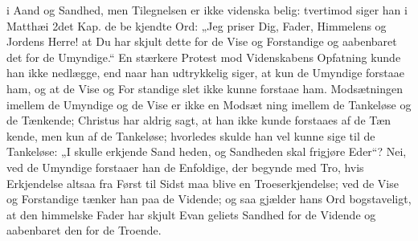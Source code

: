 \documentclass[12pt]{book}
\begin{document}
i Aand og Sandhed, men Tilegnelsen er ikke videnska\-%
belig: tvertimod siger han i Matthæi 2det Kap. de be\-%
kjendte Ord: „Jeg priser Dig, Fader, Himmelens og
Jordens Herre! at Du har skjult dette for de Vise og
Forstandige og aabenbaret det for de Umyndige.“ En
stærkere Protest mod Videnskabens Opfatning kunde
han ikke nedlægge, end naar han udtrykkelig siger, at
kun de Umyndige forstaae ham, og at de Vise og For\-%
standige slet ikke kunne forstaae ham. Modsætningen
imellem de Umyndige og de Vise er ikke en Modsæt\-%
ning imellem de Tankeløse og de Tænkende; Christus
har aldrig sagt, at han ikke kunde forstaaes af de Tæn\-%
kende, men kun af de Tankeløse; hvorledes skulde han
vel kunne sige til de Tankeløse: „I skulle erkjende Sand\-%
heden, og Sandheden skal frigjøre Eder“? Nei, ved
de Umyndige forstaaer han de Enfoldige, der begynde
med Tro, hvis Erkjendelse altsaa fra Først til Sidst maa
blive en Troeserkjendelse; ved de Vise og Forstandige
tænker han paa de Vidende; og saa gjælder hans Ord
bogstaveligt, at den himmelske Fader har skjult Evan\-%
geliets Sandhed for de Vidende og aabenbaret den for
de Troende.
\end{document}
